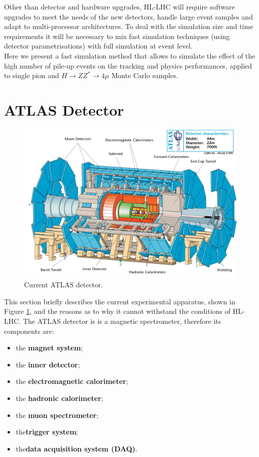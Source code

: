 \documentclass[a4paper,twoside,12pt]{article}
\begin{document}
Other than detector and hardware upgrades, HL-LHC will require software upgrades to meet the needs of the new detectors, handle large event samples and adapt to multi-processor
architectures. To deal with the simulation size and time requirements it will be necessary to mix fast simulation techniques (using detector parametrisations) with full simulation at event level.\\

Here we present a fast simulation method that allows to simulate the effect of the high number of pile-up events on the tracking and physics performances, applied to single pion and $H \rightarrow ZZ^{*} \rightarrow 4\mu$ Monte Carlo samples. 

\clearpage

\section{ATLAS Detector} \label{sec:detector}

\begin{figure} [h]
	\includegraphics[width=\textwidth]{atlasdet}
	\caption{Current ATLAS detector.}
	\label{fig:current_atlasdet}
\end{figure}

This section briefly describes the current experimental apparatus, shown in Figure \ref{fig:current_atlasdet}, and the reasons as to why it cannot withstand the conditions of HL-LHC. The ATLAS detector is is a magnetic spectrometer, therefore its components are:
\begin{itemize}
\item the \textbf{magnet system};
\item the \textbf{inner detector};
\item the \textbf{electromagnetic calorimeter};
\item the \textbf{hadronic calorimeter};
\item the \textbf{muon spectrometer};
\item the\textbf{trigger system};
\item the\textbf{data acquisition system (DAQ)}.
\end{itemize}
\end{document}
